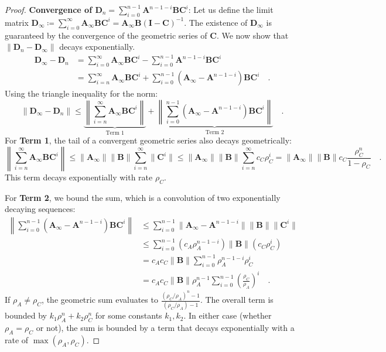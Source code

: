 \documentclass[../../main.tex]{subfiles}
\begin{document}
\begin{proof}
    \textbf{Convergence of $\bm{D}_n = \sum_{i=0}^{n-1} \bm{A}^{n-1-i} \bm{B} \bm{C}^i$}:
    Let us define the limit matrix $\bm{D}_\infty \coloneqq \sum_{i=0}^{\infty} \bm{A}_\infty \bm{B} \bm{C}^i = \bm{A}_\infty \bm{B} (\bm{I} - \bm{C})^{-1}$. The existence of $\bm{D}_\infty$ is guaranteed by the convergence of the geometric series of $\bm{C}$. We now show that $\|\bm{D}_n - \bm{D}_\infty\|$ decays exponentially.
    \begin{align*}
        \bm{D}_\infty - \bm{D}_n &= \sum_{i=0}^{\infty} \bm{A}_\infty \bm{B} \bm{C}^i - \sum_{i=0}^{n-1} \bm{A}^{n-1-i} \bm{B} \bm{C}^i \\
        &= \sum_{i=n}^{\infty} \bm{A}_\infty \bm{B} \bm{C}^i + \sum_{i=0}^{n-1} (\bm{A}_\infty - \bm{A}^{n-1-i}) \bm{B} \bm{C}^i \quad .
    \end{align*}
    Using the triangle inequality for the norm:
    \[
        \|\bm{D}_\infty - \bm{D}_n\| \leq \underbrace{\left\| \sum_{i=n}^{\infty} \bm{A}_\infty \bm{B} \bm{C}^i \right\|}_{\text{Term 1}} + \underbrace{\left\| \sum_{i=0}^{n-1} (\bm{A}_\infty - \bm{A}^{n-1-i}) \bm{B} \bm{C}^i \right\|}_{\text{Term 2}} \quad .
    \]
    For \textbf{Term 1}, the tail of a convergent geometric series also decays geometrically:
    \[
        \left\| \sum_{i=n}^{\infty} \bm{A}_\infty \bm{B} \bm{C}^i \right\| \leq \|\bm{A}_\infty\| \|\bm{B}\| \sum_{i=n}^{\infty} \|\bm{C}^i\| \leq \|\bm{A}_\infty\| \|\bm{B}\| \sum_{i=n}^{\infty} c_C \rho_C^i = \|\bm{A}_\infty\| \|\bm{B}\| c_C \frac{\rho_C^n}{1 - \rho_C} \quad .
    \]
    This term decays exponentially with rate $\rho_C$.

    For \textbf{Term 2}, we bound the sum, which is a convolution of two exponentially decaying sequences:
    \begin{align*}
        \left\| \sum_{i=0}^{n-1} (\bm{A}_\infty - \bm{A}^{n-1-i}) \bm{B} \bm{C}^i \right\| &\leq \sum_{i=0}^{n-1} \|\bm{A}_\infty - \bm{A}^{n-1-i}\| \|\bm{B}\| \|\bm{C}^i\| \\
        &\leq \sum_{i=0}^{n-1} (c_A \rho_A^{n-1-i}) \|\bm{B}\| (c_C \rho_C^i) \\
        &= c_A c_C \|\bm{B}\| \sum_{i=0}^{n-1} \rho_A^{n-1-i} \rho_C^i \\
        &= c_A c_C \|\bm{B}\| \rho_A^{n-1} \sum_{i=0}^{n-1} \left(\frac{\rho_C}{\rho_A}\right)^i \quad .
    \end{align*}
    If $\rho_A \neq \rho_C$, the geometric sum evaluates to $\frac{(\rho_C/\rho_A)^n - 1}{(\rho_C/\rho_A) - 1}$. The overall term is bounded by $k_1 \rho_A^n + k_2 \rho_C^n$ for some constants $k_1, k_2$. In either case (whether $\rho_A = \rho_C$ or not), the sum is bounded by a term that decays exponentially with a rate of $\max(\rho_A, \rho_C)$.


\end{proof}
\end{document}
